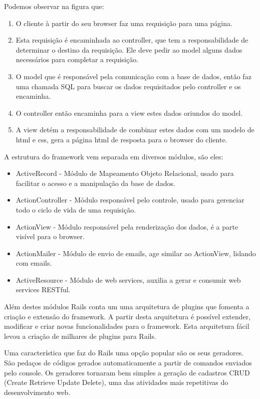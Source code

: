 Podemos observar na figura que:
\begin{enumerate}
  \item O cliente à partir do seu browser faz uma requisição para uma página.
  \item Esta requisição é encaminhada ao controller, que tem a responsabilidade de determinar o destino da requisição. Ele deve pedir ao model alguns dados necessários para completar a requisição.  
  \item O model que é responsável pela comunicação com a base de dados, então faz uma chamada SQL para buscar os dados requisitados pelo controller e os encaminha.
  \item O controller então encaminha para a view estes dados oriundos do model.
  \item A view detém a responsabilidade de combinar estes dados com um modelo de html e css, gera a página html de resposta para o browser do cliente.
\end{enumerate}


A estrutura do framework vem separada em diversos módulos, são eles:

\begin{itemize}
  \item ActiveRecord - Módulo de Mapeamento Objeto Relacional, usado para facilitar o acesso e a manipulação da base de dados. 
  \item ActionController - Módulo responsável pelo controle, usado para gerenciar todo o ciclo de vida de uma requisição. 
  \item ActionView - Módulo responsável pela renderização dos dados, é a parte visível para o browser. 
  \item ActionMailer - Módulo de envio de emails, age similar ao ActionView, lidando com emails. 
  \item ActiveResource - Módulo de web services, auxilia a gerar e consumir web services RESTful. 
\end{itemize}

Além destes módulos Rails conta um uma arquitetura de plugins que fomenta a criação e extensão do framework. A partir desta arquitetura é possível extender, modificar e criar novas funcionalidades para o framework. Esta arquitetura fácil levou a criação de milhares de plugins para Rails.

Uma característica que faz do Rails uma opção popular são os seus geradores. São pedaços de códigos gerados automaticamente a partir de comandos enviados pelo console. Os geradores tornaram bem simples a geração de cadastros CRUD (Create Retrieve Update Delete), uma das atividades mais repetitivas do desenvolvimento web.




